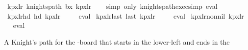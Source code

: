 \begin{isabellebody}
\isamarkupfalse%
\ kp{\isacharunderscore}{\kern0pt}{}x{}{\isacharunderscore}{\kern0pt}lr{\isacharcolon}{\kern0pt}\ {\isachardoublequoteopen}knights{\isacharunderscore}{\kern0pt}path\ b{}x{}\ kp{}x{}lr{\isachardoublequoteclose}\isanewline
%
\isadelimproof
\ \ %
\endisadelimproof
%
\isatagproof
{}\isamarkupfalse%
\ {\isacharparenleft}{\kern0pt}simp\ only{\isacharcolon}{\kern0pt}\ knights{\isacharunderscore}{\kern0pt}path{\isacharunderscore}{\kern0pt}exec{\isacharunderscore}{\kern0pt}simp{\isacharparenright}{\kern0pt}\ eval%
\endisatagproof
{\isafoldproof}%
%
\isadelimproof
\isanewline
%
\endisadelimproof
\isanewline
{}\isamarkupfalse%
\ kp{\isacharunderscore}{\kern0pt}{}x{}{\isacharunderscore}{\kern0pt}lr{\isacharunderscore}{\kern0pt}hd{\isacharcolon}{\kern0pt}\ {\isachardoublequoteopen}hd\ kp{}x{}lr\ {\isacharequal}{\kern0pt}\ {\isacharparenleft}{\kern0pt}{}{\isacharcomma}{\kern0pt}{}{\isacharparenright}{\kern0pt}{\isachardoublequoteclose}%
\isadelimproof
\ %
\endisadelimproof
%
\isatagproof
{}\isamarkupfalse%
\ eval%
\endisatagproof
{\isafoldproof}%
%
\isadelimproof
%
\endisadelimproof
\isanewline
\isanewline
{}\isamarkupfalse%
\ kp{\isacharunderscore}{\kern0pt}{}x{}{\isacharunderscore}{\kern0pt}lr{\isacharunderscore}{\kern0pt}last{\isacharcolon}{\kern0pt}\ {\isachardoublequoteopen}last\ kp{}x{}lr\ {\isacharequal}{\kern0pt}\ {\isacharparenleft}{\kern0pt}{}{\isacharcomma}{\kern0pt}{}{\isacharparenright}{\kern0pt}{\isachardoublequoteclose}%
\isadelimproof
\ %
\endisadelimproof
%
\isatagproof
{}\isamarkupfalse%
\ eval%
\endisatagproof
{\isafoldproof}%
%
\isadelimproof
%
\endisadelimproof
\isanewline
\isanewline
{}\isamarkupfalse%
\ kp{\isacharunderscore}{\kern0pt}{}x{}{\isacharunderscore}{\kern0pt}lr{\isacharunderscore}{\kern0pt}non{\isacharunderscore}{\kern0pt}nil{\isacharcolon}{\kern0pt}\ {\isachardoublequoteopen}kp{}x{}lr\ {\isasymnoteq}\ {\isacharbrackleft}{\kern0pt}{\isacharbrackright}{\kern0pt}{\isachardoublequoteclose}%
\isadelimproof
\ %
\endisadelimproof
%
\isatagproof
{}\isamarkupfalse%
\ eval%
\endisatagproof
{\isafoldproof}%
%
\isadelimproof
%
\endisadelimproof
%
\begin{isamarkuptext}%
A Knight's path for the -board that starts in the lower-left and ends in the 

\end{isamarkuptext}
\end{isabellebody}
